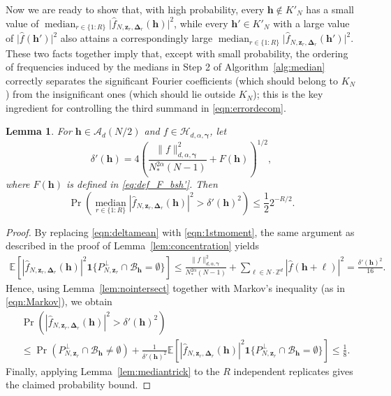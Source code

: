 \documentclass[a4paper,11pt]{article}
\newtheorem{lemma}[theorem]{Lemma}
\newcommand{\bsh}{\boldsymbol{h}}
\newcommand{\bsl}{\boldsymbol{\ell}}
\newcommand{\bsz}{\boldsymbol{z}}
\newcommand{\bsgamma}{\boldsymbol{\gamma}}
\newcommand{\bsDelta}{\boldsymbol{\Delta}}
\newcommand{\ZZ}{\mathbb{Z}}
\newcommand{\Hcal}{\mathcal{H}}
\newcommand{\e}{\mathbb{E}}
\newcommand{\bsone}{\boldsymbol{1}}
\begin{document}
Now we are ready to show that, with high probability, every $\bsh\notin K'_N$ has a small value of 
\(\operatorname{median}_{r\in\{1{:}R\}} \lvert \widehat{f}_{N,\bsz_r,\bsDelta_r}(\bsh)\rvert^2\), 
while every \(\bsh'\in K'_N\) with a large value of \(\lvert\widehat{f}(\bsh')\rvert^2\) 
also attains a correspondingly large 
\(\operatorname{median}_{r\in\{1{:}R\}} \lvert \widehat{f}_{N,\bsz_r,\bsDelta_r}(\bsh')\rvert^2\).
These two facts together imply that, except with small probability, 
the ordering of frequencies induced by the medians in Step 2 of Algorithm~\ref{alg:median} 
correctly separates the significant Fourier coefficients (which should belong to \(K_N\)) 
from the insignificant ones (which should lie outside \(K_N\)); 
this is the key ingredient for controlling the third summand in \eqref{eqn:errordecom}.

\begin{lemma}\label{lem:mediannorm}
    For $\bsh\in \mathcal{A}_d(N/2)$ and $f\in \Hcal_{d,\alpha,\bsgamma}$, let
\[
\delta'(\bsh) = 4 \left(\frac{\|f\|^2_{d,\alpha,\bsgamma}}{N_*^{2\alpha}(N-1)} + F(\bsh)\right)^{1/2},
\]
where $F(\bsh)$ is defined in \eqref{eq:def_F_bsh'}. Then 
\[
\Pr\left( \operatorname*{median}_{r\in\{1{:}R\}}
   \left| \widehat{f}_{N,\bsz_r,\bsDelta_r}(\bsh)\right|^2 
   > \delta'(\bsh)^2 \right)\leq \frac{1}{2}2^{-R/2}.
\]
\end{lemma}
\begin{proof}
By replacing \eqref{eqn:deltamean} with \eqref{eqn:1stmoment}, the same argument as described in the proof of Lemma~\ref{lem:concentration} yields
\begin{align*}
    \e\left[|\widehat{f}_{N,\bsz_r,\bsDelta_r}(\bsh)|^2\bsone\{P_{N,\boldsymbol{z}_r}^\perp\cap \mathcal{B}_{\bsh}= \emptyset\}\right]
    \leq  \frac{\|f\|^2_{d,\alpha,\bsgamma}}{N_*^{2\alpha}(N-1) }+\sum_{\bsl \in N\cdot \ZZ^d }|\widehat{f}(\bsh+\bsl)|^2=\frac{\delta'(\bsh)^2}{16}.
\end{align*}
Hence, using Lemma~\ref{lem:nointersect} together with Markov’s inequality (as in \eqref{eqn:Markov}), we obtain
\begin{align*}
   & \Pr\left( | \widehat{f}_{N,\bsz_r,\bsDelta_r}(\bsh)|^2 > \delta'(\bsh)^2 \right) \\
   & \leq \Pr(P_{N,\boldsymbol{z}_r}^\perp\cap \mathcal{B}_{\bsh}\neq \emptyset)+\frac{1}{\delta'(\bsh)^2}\e\left[|\widehat{f}_{N,\bsz_r,\bsDelta_r}(\bsh)|^2\bsone\{P_{N,\boldsymbol{z}_r}^\perp\cap \mathcal{B}_{\bsh}= \emptyset\}\right] \le \frac{1}{8}.
\end{align*}
Finally, applying Lemma~\ref{lem:mediantrick} to the $R$ independent replicates gives the claimed probability bound.
\end{proof}
\end{document}
